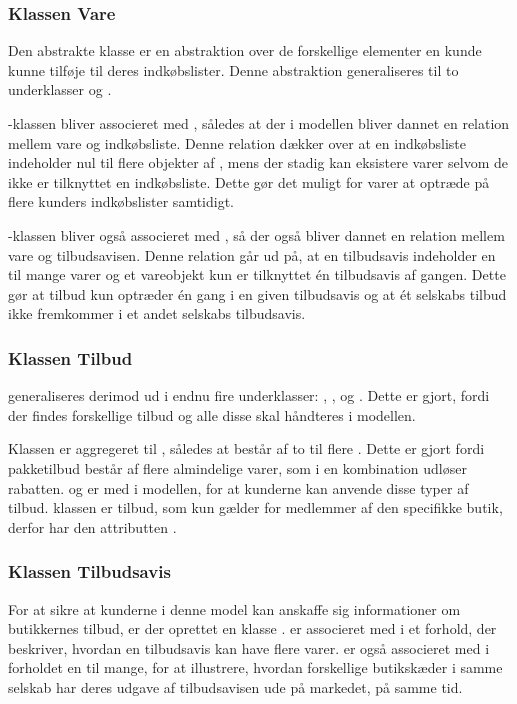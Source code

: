 \subsubsection{Klassen Vare}
Den abstrakte klasse  er en abstraktion over de forskellige elementer en kunde kunne tilføje til deres indkøbslister. Denne abstraktion generaliseres til to underklasser  og . 

-klassen bliver associeret med , således at der i modellen bliver dannet en relation mellem vare og indkøbsliste. Denne relation dækker over at en indkøbsliste indeholder nul til flere objekter af , mens der stadig kan eksistere varer selvom de ikke er tilknyttet en indkøbsliste. Dette gør det muligt for varer at optræde på flere kunders indkøbslister samtidigt.

-klassen bliver også associeret med , så der også bliver dannet en relation mellem vare og tilbudsavisen. Denne relation går ud på, at en tilbudsavis indeholder en til mange varer og et vareobjekt kun er tilknyttet én tilbudsavis af gangen. Dette gør at tilbud kun optræder én gang i en given tilbudsavis og at ét selskabs tilbud ikke fremkommer i et andet selskabs tilbudsavis.

\subsubsection{Klassen Tilbud}
 generaliseres derimod ud i endnu fire underklasser: , ,  og . Dette er gjort, fordi der findes forskellige tilbud og alle disse skal håndteres i modellen. 

Klassen  er aggregeret til , således at  består af to til flere . Dette er gjort fordi pakketilbud består af flere almindelige varer, som i en kombination udløser rabatten.  og  er med i modellen, for at kunderne kan anvende disse typer af tilbud.  klassen er tilbud, som kun gælder for medlemmer af den specifikke butik, derfor har den attributten .

\subsubsection{Klassen Tilbudsavis}
For at sikre at kunderne i denne model kan anskaffe sig informationer om butikkernes tilbud, er der oprettet en klasse .  er associeret med  i et forhold, der beskriver, hvordan en tilbudsavis kan have flere varer.  er også associeret med  i forholdet en til mange, for at illustrere, hvordan forskellige butikskæder i samme selskab har deres udgave af tilbudsavisen ude på markedet, på samme tid.

